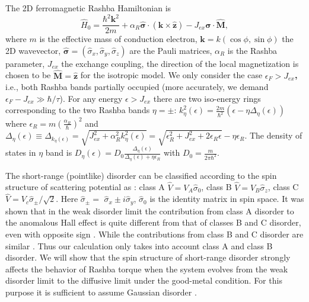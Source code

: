 \documentclass
[aps,pra,amsfonts,amssymb,twocolumn,amsmath,preprintnumbers,nofootinbib,floatfix,
showpacs,superscriptaddress]{revtex4-1}%
\begin{document}
The 2D ferromagnetic Rashba Hamiltonian is%
\begin{equation}
\hat{H}_{0}=\frac{\hbar^{2}\mathbf{k}^{2}}{2m}+\alpha_{R}\mathbf{\hat{\sigma}%
}\cdot\left(  \mathbf{k}\times\mathbf{\hat{z}}\right)  -J_{ex}\mathbf{\hat
{\sigma}\cdot\hat{M}}, \label{model}%
\end{equation}
where $m$ is the effective mass of conduction electron, $\mathbf{k}=k\left(
\cos\phi,\sin\phi\right)  $ the 2D wavevector, $\mathbf{\hat{\sigma}}=\left(
\hat{\sigma}_{x},\hat{\sigma}_{y},\hat{\sigma}_{z}\right)  $ are the Pauli
matrices, $\alpha_{R}$ is the Rashba parameter, $J_{ex}$ the exchange
coupling, the direction of the local magnetization is chosen to be
$\mathbf{\hat{M}=\hat{z}}$ for the isotropic model. We only consider the case
$\epsilon_{F}>J_{ex}$\textbf{,} i.e., both Rashba bands partially occupied
(more accurately, we demand $\epsilon_{F}-J_{ex}\gg\hbar/\tau$). For any
energy $\epsilon>J_{ex}$ there are two iso-energy rings corresponding to the
two Rashba bands $\eta=\pm$: $k_{\eta}^{2}\left(  \epsilon\right)  =\frac
{2m}{\hbar^{2}}\left(  \epsilon-\eta\Delta_{\eta}\left(  \epsilon\right)
\right)  $ where $\epsilon_{R}=m\left(  \frac{\alpha_{R}}{\hbar}\right)  ^{2}$
and $\Delta_{\eta}\left(  \epsilon\right)  \equiv\Delta_{k_{\eta}\left(
\epsilon\right)  }=\sqrt{J_{ex}^{2}+\alpha_{R}^{2}k_{\eta}^{2}\left(
\epsilon\right)  }=\sqrt{\epsilon_{R}^{2}+J_{ex}^{2}+2\epsilon_{R}\epsilon
}-\eta\epsilon_{R}$. The density of states in $\eta$ band is $D_{\eta}\left(
\epsilon\right)  =D_{0}\frac{\Delta_{\eta}\left(  \epsilon\right)  }%
{\Delta_{\eta}\left(  \epsilon\right)  +\eta\epsilon_{R}}$ with $D_{0}%
=\frac{m}{2\pi\hbar^{2}}$.

The short-range (pointlike) disorder can be classified according to the spin
structure of scattering potential as \cite{Yang2011}: class A $\hat{V}%
=V_{A}\hat{\sigma}_{0}$, class B $\hat{V}=V_{B}\hat{\sigma}_{z}$, class C
$\hat{V}=V_{c}\hat{\sigma}_{\pm}/\sqrt{2}$. Here $\hat{\sigma}_{\pm}=$
$\hat{\sigma}_{x}\pm i\hat{\sigma}_{y}$, $\hat{\sigma}_{0}$ is the identity
matrix in spin space. It was shown that in the weak disorder limit the
contribution from class A disorder to the anomalous Hall effect is quite
different from that of classes B and C disorder, even with opposite sign
\cite{Yang2011}. While the contributions from class B and C disorder are
similar \cite{Yang2011}. Thus our calculation only takes into account class A
and class B disorder. We will show that the spin structure of short-range
disorder strongly affects the behavior of Rashba torque when the system
evolves from the weak disorder limit to the diffusive limit under the
good-metal condition. For this purpose it is sufficient to assume Gaussian
disorder \cite{Titov2015,Titov2017,Manchon2012}.
\end{document}
